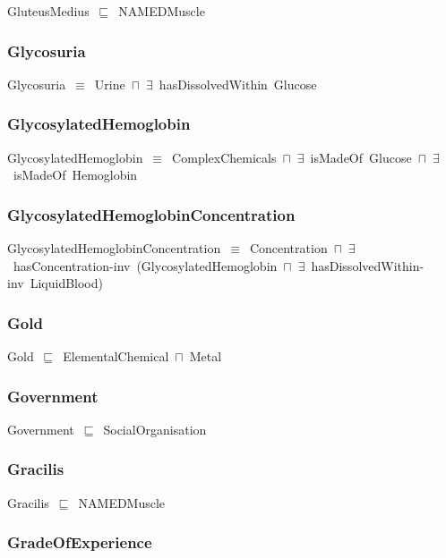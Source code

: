 \documentclass{article}
\begin{document}
GluteusMedius~\ensuremath{\sqsubseteq}~NAMEDMuscle~

\subsubsection*{Glycosuria}

Glycosuria~\ensuremath{\equiv}~Urine~\ensuremath{\sqcap}~\ensuremath{\exists}~hasDissolvedWithin~Glucose

\subsubsection*{GlycosylatedHemoglobin}

GlycosylatedHemoglobin~\ensuremath{\equiv}~ComplexChemicals~\ensuremath{\sqcap}~\ensuremath{\exists}~isMadeOf~Glucose~\ensuremath{\sqcap}~\ensuremath{\exists}~isMadeOf~Hemoglobin

\subsubsection*{GlycosylatedHemoglobinConcentration}

GlycosylatedHemoglobinConcentration~\ensuremath{\equiv}~Concentration~\ensuremath{\sqcap}~\ensuremath{\exists}~hasConcentration-inv~(GlycosylatedHemoglobin~\ensuremath{\sqcap}~\ensuremath{\exists}~hasDissolvedWithin-inv~LiquidBlood)

\subsubsection*{Gold}

Gold~\ensuremath{\sqsubseteq}~ElementalChemical~\ensuremath{\sqcap}~Metal~

\subsubsection*{Government}

Government~\ensuremath{\sqsubseteq}~SocialOrganisation~

\subsubsection*{Gracilis}

Gracilis~\ensuremath{\sqsubseteq}~NAMEDMuscle~

\subsubsection*{GradeOfExperience}
\end{document}
